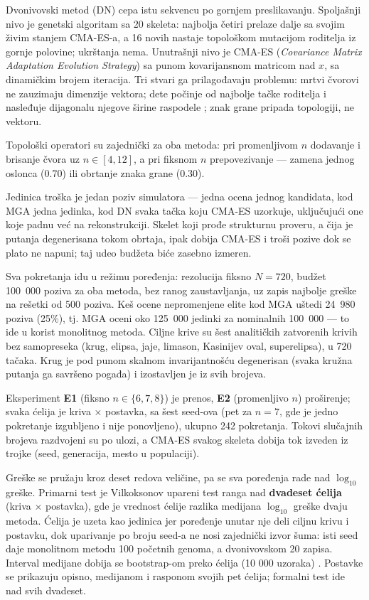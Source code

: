 \documentclass[
  conference,
  a4paper,
  10pt]{IEEEtran}
\begin{document}
Dvonivovski metod (DN) cepa istu sekvencu po gornjem preslikavanju.
Spoljašnji nivo je genetski algoritam sa 20 skeleta: najbolja četiri
prelaze dalje sa svojim živim stanjem CMA-ES-a, a 16 novih nastaje
topološkom mutacijom roditelja iz gornje polovine; ukrštanja nema.
Unutrašnji nivo je CMA-ES (\emph{Covariance Matrix Adaptation Evolution
Strategy}) \citep{hansen} sa punom kovarijansnom matricom nad \(x\), sa
dinamičkim brojem iteracija. Tri stvari ga prilagođavaju problemu: mrtvi
čvorovi ne zauzimaju dimenzije vektora; dete počinje od najbolje tačke
roditelja i nasleđuje dijagonalu njegove širine raspodele
\citep{nomura}; znak grane pripada topologiji, ne vektoru.

Topološki operatori su zajednički za oba metoda: pri promenljivom \(n\)
dodavanje i brisanje čvora uz \(n \in [4,12]\), a pri fiksnom \(n\)
prepovezivanje --- zamena jednog oslonca (0.70) ili obrtanje znaka grane
(0.30).

Jedinica troška je jedan poziv simulatora --- jedna ocena jednog
kandidata, kod MGA jedna jedinka, kod DN svaka tačka koju CMA-ES
uzorkuje, uključujući one koje padnu već na rekonstrukciji. Skelet koji
prođe strukturnu proveru, a čija je putanja degenerisana tokom obrtaja,
ipak dobija CMA-ES i troši pozive dok se plato ne napuni; taj udeo
budžeta biće zasebno izmeren.

Sva pokretanja idu u režimu poređenja: rezolucija fiksno \(N = 720\),
budžet 100~000 poziva za oba metoda, bez ranog zaustavljanja, uz zapis
najbolje greške na rešetki od 500 poziva. Keš ocene nepromenjene elite
kod MGA uštedi 24~980 poziva (25\%), tj. MGA oceni oko 125~000 jedinki
za nominalnih 100~000 --- to ide u korist monolitnog metoda. Ciljne
krive su šest analitičkih zatvorenih krivih bez samopreseka (krug,
elipsa, jaje, limason, Kasinijev oval, superelipsa), u 720 tačaka. Krug
je pod punom skalnom invarijantnošću degenerisan (svaka kružna putanja
ga savršeno pogađa) i izostavljen je iz svih brojeva.

Eksperiment \textbf{E1} (fiksno \(n \in \{6,7,8\}\)) je prenos,
\textbf{E2} (promenljivo \(n\)) proširenje; svaka ćelija je kriva ×
postavka, sa šest seed-ova (pet za \(n=7\), gde je jedno pokretanje
izgubljeno i nije ponovljeno), ukupno 242 pokretanja. Tokovi slučajnih
brojeva razdvojeni su po ulozi, a CMA-ES svakog skeleta dobija tok
izveden iz trojke (seed, generacija, mesto u populaciji).

Greške se pružaju kroz deset redova veličine, pa se sva poređenja rade
nad \(\log_{10}\) greške. Primarni test je Vilkoksonov upareni test
ranga \citep{wilcoxon} nad \textbf{dvadeset ćelija} (kriva × postavka),
gde je vrednost ćelije razlika medijana \(\log_{10}\) greške dvaju
metoda. Ćelija je uzeta kao jedinica jer poređenje unutar nje deli
ciljnu krivu i postavku, dok uparivanje po broju seed-a ne nosi
zajednički izvor šuma: isti seed daje monolitnom metodu 100 početnih
genoma, a dvonivovskom 20 zapisa. Interval medijane dobija se
bootstrap-om preko ćelija (10 000 uzoraka) \citep{efron}. Postavke se
prikazuju opisno, medijanom i rasponom svojih pet ćelija; formalni test
ide nad svih dvadeset.
\end{document}
